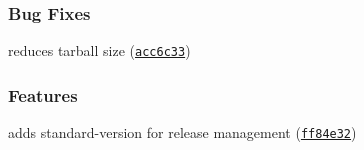 \subsubsection*{Bug Fixes}


\begin{DoxyItemize}
\item reduces tarball size (\href{https://github.com/yargs/cliui/commit/acc6c33}{\tt acc6c33})
\end{DoxyItemize}

\subsubsection*{Features}


\begin{DoxyItemize}
\item adds standard-\/version for release management (\href{https://github.com/yargs/cliui/commit/ff84e32}{\tt ff84e32}) 
\end{DoxyItemize}